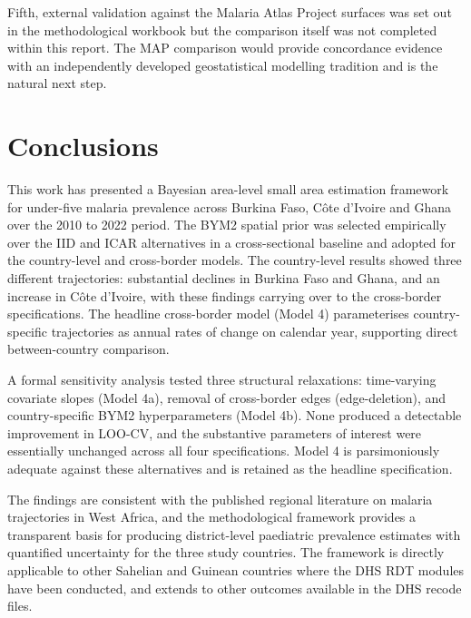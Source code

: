 \documentclass{article}
\begin{document}
Fifth, external validation against the Malaria Atlas Project
\citep{bhatt2015, weiss2020} surfaces was set out in the methodological
workbook but the comparison itself was not completed within this report.
The MAP comparison would provide concordance evidence with an
independently developed geostatistical modelling tradition and is the
natural next step.

\section{Conclusions}\label{conclusions}

\label{sec:conclusion}

This work has presented a Bayesian area-level small area estimation
framework for under-five malaria prevalence across Burkina Faso, Côte
d'Ivoire and Ghana over the 2010 to 2022 period. The BYM2 spatial prior
was selected empirically over the IID and ICAR alternatives in a
cross-sectional baseline and adopted for the country-level and
cross-border models. The country-level results showed three different
trajectories: substantial declines in Burkina Faso and Ghana, and an
increase in Côte d'Ivoire, with these findings carrying over to the
cross-border specifications. The headline cross-border model (Model 4)
parameterises country-specific trajectories as annual rates of change on
calendar year, supporting direct between-country comparison.

A formal sensitivity analysis tested three structural relaxations:
time-varying covariate slopes (Model 4a), removal of cross-border edges
(edge-deletion), and country-specific BYM2 hyperparameters (Model 4b).
None produced a detectable improvement in LOO-CV, and the substantive
parameters of interest were essentially unchanged across all four
specifications. Model 4 is parsimoniously adequate against these
alternatives and is retained as the headline specification.

The findings are consistent with the published regional literature on
malaria trajectories in West Africa, and the methodological framework
provides a transparent basis for producing district-level paediatric
prevalence estimates with quantified uncertainty for the three study
countries. The framework is directly applicable to other Sahelian and
Guinean countries where the DHS RDT modules have been conducted, and
extends to other outcomes available in the DHS recode files.



\end{document}
